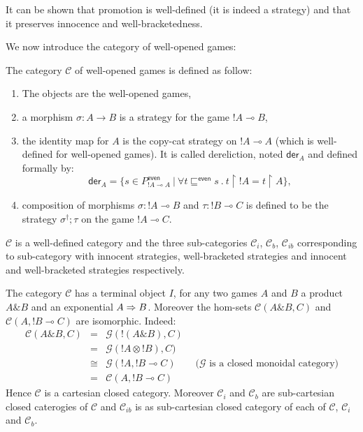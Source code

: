 It can be shown that promotion is well-defined (it is indeed a strategy) and that it preserves innocence and
well-bracketedness.


We now introduce the category of well-opened games:
\begin{dfn}
The category $\mathcal{C}$ of well-opened games is defined as follow:
\begin{enumerate}
\item The objects are the well-opened games,
\item a morphism $\sigma : A \rightarrow B$ is a strategy for the game $!A \multimap B$,
\item the identity map for $A$ is the copy-cat strategy on $!A \multimap A$ (which is well-defined for well-opened games).
It is called dereliction, noted
$\textsf{der}_A$ and defined formally by:
$$ \textsf{der}_A = \{ s \in P^{\textsf{even}}_{{!A} \multimap A} \ | \ \forall t \sqsubseteq^{\textsf{even}} s \ . \ t \upharpoonright {!A} = t \upharpoonright A \},$$
\item composition of morphisms $\sigma : {!A} \multimap B$ and $\tau : {!B} \multimap C$ is defined to be
the strategy $\sigma^\dagger;\tau$ on the game ${!A} \multimap C$.
\end{enumerate}
\end{dfn}
$\mathcal{C}$ is a well-defined category and the three sub-categories
$\mathcal{C}_i$, $\mathcal{C}_b$, $\mathcal{C}_{ib}$ corresponding to sub-category
with innocent strategies, well-bracketed strategies and innocent and well-bracketed strategies respectively.


The category $\mathcal{C}$ has a terminal object $I$, for any two games $A$ and $B$ a product $A \& B$ and
an exponential $A \Rightarrow B$. Moreover the hom-sets $\mathcal{C}(A \& B,C)$ and
$\mathcal{C}(A,!B \multimap C)$ are isomorphic. Indeed:
\begin{eqnarray*}
\mathcal{C}(A\& B,C) &=& \mathcal{G}(!(A\& B),C) \\
&=& \mathcal{G}({!A}\otimes {!B}),C) \\
&\cong& \mathcal{G}({!A}, {!B} \multimap C) \qquad  \mbox{($\mathcal{G}$ is a closed monoidal category)}\\
&=& \mathcal{C}(A, {!B} \multimap C)
\end{eqnarray*}
Hence $\mathcal{C}$ is a cartesian closed category. Moreover $\mathcal{C}_i$ and $\mathcal{C}_b$
are sub-cartesian closed caterogies of $\mathcal{C}$ and $\mathcal{C}_{ib}$ is as sub-cartesian closed category
of each of $\mathcal{C}$, $\mathcal{C}_i$ and $\mathcal{C}_b$.


